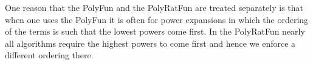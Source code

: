 One reason that the PolyFun and the PolyRatFun are treated separately is 
that when one uses the PolyFun it is often for power expansions in which 
the ordering of the terms is such that the lowest powers come first. In the 
PolyRatFun nearly all algorithms require the highest powers to come first 
and hence we enforce a different ordering there. 
